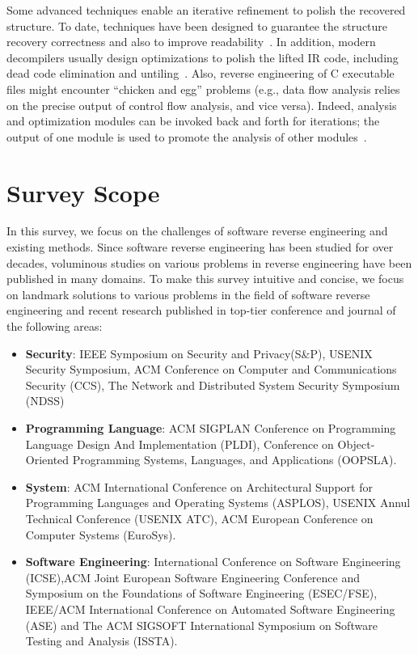Some advanced techniques enable an iterative refinement to polish the
recovered structure. To date, techniques have been designed to guarantee the
structure recovery correctness and also to improve
readability~\cite{brumley2013native,yakdan2015no}. In addition, modern
decompilers usually design optimizations to polish the lifted IR code,
including dead code elimination and untiling~\cite{brumley2013native,cifuentes1994reverse,kvroustek2017retdec}.
Also, reverse engineering of C executable files might encounter ``chicken and
egg'' problems (e.g., data flow analysis relies on the precise output of
control flow analysis, and vice versa). Indeed, analysis and optimization
modules can be invoked back and forth for iterations; the output of one module
is used to promote the analysis of other modules~\cite{kvroustek2017retdec}.


\section{Survey Scope} \label{sec:background-scope}
In this survey, we focus on the challenges of software reverse engineering and
existing methods. Since software reverse engineering has been studied for over
decades, voluminous studies on various problems in reverse engineering have
been published in many domains.
To make this survey intuitive and concise, we focus on landmark solutions to
various problems in the field of software reverse engineering and recent
research published in top-tier conference and journal of the following areas:

\begin{itemize}
  \item \textbf{Security}: IEEE Symposium on Security and Privacy(S\&P),
  USENIX Security Symposium, ACM Conference on Computer and Communications
  Security (CCS), The Network and Distributed System Security Symposium (NDSS)
  \item \textbf{Programming Language}: ACM SIGPLAN Conference on Programming
  Language Design And Implementation (PLDI), Conference on Object-Oriented
  Programming Systems, Languages, and Applications (OOPSLA).
  \item \textbf{System}: ACM International Conference on Architectural Support
  for Programming Languages and Operating Systems (ASPLOS), USENIX Annul
  Technical Conference (USENIX ATC), ACM European Conference on Computer
  Systems (EuroSys).
  \item \textbf{Software Engineering}: International Conference on Software
  Engineering (ICSE),ACM Joint European Software Engineering Conference and
  Symposium on the Foundations of Software Engineering (ESEC/FSE), IEEE/ACM
  International Conference on Automated Software Engineering (ASE) and The ACM
  SIGSOFT International Symposium on Software Testing and Analysis (ISSTA).
\end{itemize}


\newpage
